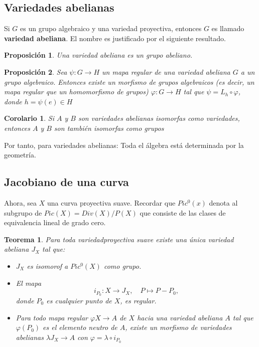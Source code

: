 \documentclass[12pt,a4paper]{report}
\newtheorem{teo}{Teorema}[chapter]
\newtheorem{cor}{Corolario}[chapter]
\newtheorem{prop}{Proposición}[chapter]
\begin{document}
\subsection{Variedades abelianas}

Si $G$ es un grupo algebraico y una variedad proyectiva, entonces $G$ es llamado \textbf{variedad abeliana}. El nombre es justificado por el siguiente resultado.

\begin{prop}
	Una variedad abeliana es un grupo abeliano.
\end{prop}

\begin{prop}
	Sea $\psi: G \rightarrow H$ un mapa regular de una variedad abeliana $G$ a un grupo algebraico. Entonces existe un morfismo de grupos algebraicos (es decir, un mapa regular que un homomorfismo de grupos) $\varphi : G \rightarrow H$ tal que $\psi = L_{h} \circ \varphi$, donde $h= \psi(e) \in H$
\end{prop}

\begin{cor}
	Si $A$ y $B$ son variedades abelianas isomorfas como variedades, entonces $A$ y $B$ son también isomorfas como grupos
\end{cor}

Por tanto, para variedades abelianas: Toda el álgebra está determinada por la geometría.


\subsection{Jacobiano de una curva}
Ahora, sea $X$ una curva proyectiva suave. Recordar que $Pic^{0}(x)$ denota al subgrupo de $Pic (X)= Div(X)/ P(X)$ que consiste de las clases de equivalencia lineal de grado cero.

\begin{teo}\label{2.1.82}
	Para toda variedadproyectiva suave existe una única variedad abeliana $J_{X}$ tal que:
	\begin{itemize}
		\item $J_{X}$ es isomorof a $Pic^{0}(X)$ como grupo.
		\item El mapa $$i_{P_{0}} : X \rightarrow J_{X} ,  \quad P \mapsto P-P_{0}  ,$$ donde $P_{0}$ es cualquier punto de $X$, es regular.
		\item Para todo mapa regular $\varphi X \rightarrow A$ de $X$ hacia una variedad abeliana $A$ tal que $\varphi(P_{0})$ es el elemento neutro de $A$, existe un morfismo de variedades abelianas $\lambda J_{X} \rightarrow A$ con $\varphi = \lambda \circ i_{P_{0}}$
	\end{itemize}
\end{teo}
\end{document}
